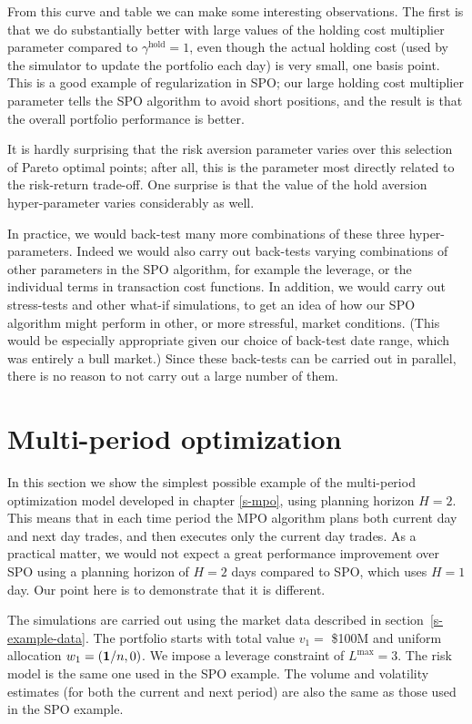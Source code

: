 \documentclass[openany]{article}  %
\renewcommand{\S}{section~}
\begin{document}
From this curve and table we can make some interesting observations.
The first is that we do substantially better with large values of
the holding cost multiplier parameter compared to $\gamma^\mathrm{hold}=1$,
even though the actual holding cost (used by the simulator to update the portfolio
each day) is very small, one basis point.  This is a good example of
regularization in SPO; our large holding cost multiplier parameter
tells the SPO algorithm to avoid short positions, and the result is that
the overall portfolio performance is better.

It is hardly surprising
that the risk aversion parameter varies over this selection of Pareto
optimal points; after all,
this is the parameter most directly related to the risk-return trade-off.
One surprise is that the value of the hold aversion hyper-parameter
varies considerably as well.

In practice, we would back-test many more combinations of these three
hyper-parameters.
Indeed we would also carry out back-tests varying combinations of
other parameters in the SPO algorithm, for example the leverage,
or the individual terms in transaction cost functions.  In addition, we
would carry out stress-tests and other what-if simulations, to get an idea
of how our SPO algorithm might perform in other, or more stressful,
market conditions.
(This would be especially appropriate given our choice of
back-test date range, which was entirely a bull market.)
Since these back-tests can be carried out in parallel, there is no
reason to not carry out a large number of them.

\section{Multi-period optimization}
In this section we show the simplest possible example
of the multi-period optimization model developed in chapter \ref{s-mpo},
using planning horizon $H=2$.  This means that in each time period
the MPO algorithm plans both current day and next day trades, and then
executes only the current day trades.
As a practical matter, we would not expect a great performance improvement
over SPO using a planning horizon of $H=2$ days compared to SPO, which uses
$H=1$ day.  Our point here is to demonstrate that it is different.

The simulations are carried out using the market
data described in \S\ref{s-example-data}.
The portfolio starts with total value $v_1 =$ \$100M and uniform allocation
$w_1 = (\mathbf 1/n,0)$.  We impose a leverage constraint of $L^\mathrm{max}=3$.
The risk model is the same one used in the SPO example.  The volume and volatility
estimates (for both the current and next period)
are also the same as those used in the SPO example.
\end{document}

